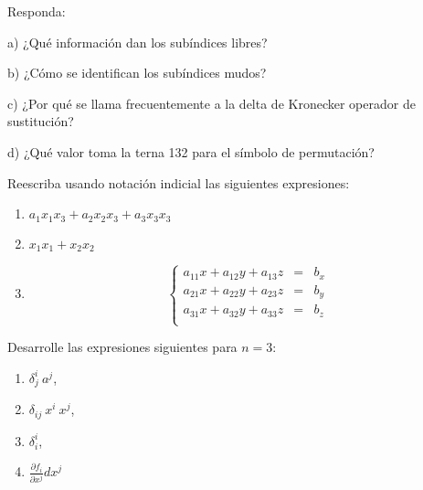  \vspace{0.5 cm}

 \begin{exercise}

\item

Responda:

a) ¿Qué información  dan los subíndices libres?

b) ¿Cómo se identifican los subíndices mudos?

c) ¿Por qué se llama frecuentemente a la delta de Kronecker operador de sustitución?

d) ¿Qué valor toma la terna 132 para el símbolo de permutación?

\end{exercise}


\begin{exercise}
\item 

Reescriba usando notación indicial las siguientes expresiones:
\begin{enumerate}
  
\item

$a_1x_1x_3+ a_2x_2x_3+ a_3x_3x_3$
\item
$x_1x_1+x_2x_2$
\item
\begin{equation} 
\left\{ \begin{array} {rcl} \nonumber
               a_{11}x+a_{12}y+a_{13}z& =&b_x\\
               a_{21}x+a_{22}y+a_{23}z& =&b_y\\
               a_{31}x+a_{32}y+a_{33}z& =&b_z\\
                   \end{array}
           \right.
           \label{ejsistnt}
\end{equation}
\end{enumerate}
\end{exercise}
\begin{exercise}
\item 
Desarrolle las expresiones siguientes para $n=3$: 
\begin{enumerate}
  \item

$ \delta^i_j~a^j$,  

\item

$\delta_{ij}~x^i~x^j$, 


\item
$\delta^i_i$,


\item
$\frac{\partial f_i}{\partial x^j}dx^j$


\end{enumerate}
\end{exercise}

